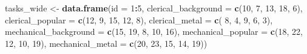 \documentclass[
]{article}
\newenvironment{Shaded}{\begin{snugshade}}{\end{snugshade}}
\newcommand{\DataTypeTok}[1]{\textcolor[rgb]{0.13,0.29,0.53}{#1}}
\newcommand{\DecValTok}[1]{\textcolor[rgb]{0.00,0.00,0.81}{#1}}
\newcommand{\KeywordTok}[1]{\textcolor[rgb]{0.13,0.29,0.53}{\textbf{#1}}}
\newcommand{\NormalTok}[1]{#1}
\newcommand{\OperatorTok}[1]{\textcolor[rgb]{0.81,0.36,0.00}{\textbf{#1}}}
\newcommand{\StringTok}[1]{\textcolor[rgb]{0.31,0.60,0.02}{#1}}
\begin{document}
\begin{Shaded}
\begin{Highlighting}[]
\NormalTok{tasks_wide <-}\StringTok{ }\KeywordTok{data.frame}\NormalTok{(}\DataTypeTok{id =} \DecValTok{1}\OperatorTok{:}\DecValTok{5}\NormalTok{,}
                         \DataTypeTok{clerical_background   =} \KeywordTok{c}\NormalTok{(}\DecValTok{10}\NormalTok{,  }\DecValTok{7}\NormalTok{, }\DecValTok{13}\NormalTok{, }\DecValTok{18}\NormalTok{,  }\DecValTok{6}\NormalTok{),}
                         \DataTypeTok{clerical_popular      =} \KeywordTok{c}\NormalTok{(}\DecValTok{12}\NormalTok{,  }\DecValTok{9}\NormalTok{, }\DecValTok{15}\NormalTok{, }\DecValTok{12}\NormalTok{,  }\DecValTok{8}\NormalTok{),}
                         \DataTypeTok{clerical_metal        =} \KeywordTok{c}\NormalTok{( }\DecValTok{8}\NormalTok{,  }\DecValTok{4}\NormalTok{,  }\DecValTok{9}\NormalTok{,  }\DecValTok{6}\NormalTok{,  }\DecValTok{3}\NormalTok{),}
                         \DataTypeTok{mechanical_background =} \KeywordTok{c}\NormalTok{(}\DecValTok{15}\NormalTok{, }\DecValTok{19}\NormalTok{,  }\DecValTok{8}\NormalTok{, }\DecValTok{10}\NormalTok{, }\DecValTok{16}\NormalTok{),}
                         \DataTypeTok{mechanical_popular    =} \KeywordTok{c}\NormalTok{(}\DecValTok{18}\NormalTok{, }\DecValTok{22}\NormalTok{, }\DecValTok{12}\NormalTok{, }\DecValTok{10}\NormalTok{, }\DecValTok{19}\NormalTok{),}
                         \DataTypeTok{mechanical_metal      =} \KeywordTok{c}\NormalTok{(}\DecValTok{20}\NormalTok{, }\DecValTok{23}\NormalTok{, }\DecValTok{15}\NormalTok{, }\DecValTok{14}\NormalTok{, }\DecValTok{19}\NormalTok{))}


\end{Highlighting}
\end{Shaded}
\end{document}
